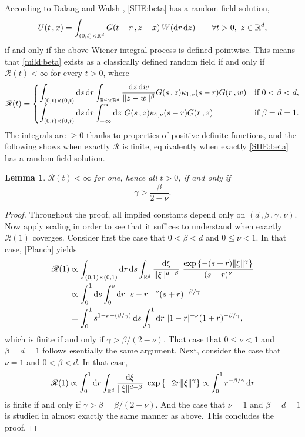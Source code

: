 \documentclass[reqno]{amsart}
\newcommand{\<}{\langle}
\renewcommand{\>}{\rangle}
\newcommand{\R}{\mathbb{R}}
\newcommand{\1}{\mathbb{1}}
\renewcommand{\d}{{\rm d}}
\renewcommand{\ge}{\geqslant}
\renewcommand{\le}{\leqslant}
\newtheorem{lemma}[stat]{Lemma}
\theoremstyle{definition}
\numberwithin{equation}{section}
\begin{document}
According to Dalang 
\cite{Dalang} and Walsh \cite{Walsh},
\eqref{SHE:beta} has a random-field solution,
\begin{equation}\label{mild:beta}
	U(t\,,x) = \int_{(0,t)\times\R^d} G(t-r\,,z-x)\,W(\d r\,\d z)
	\qquad\forall t>0,\ z\in\R^d,
\end{equation}
if and only if the above Wiener integral process is defined pointwise.
This means that \eqref{mild:beta} exists as a classically defined
random field if and only if $\mathscr{R}(t)<\infty$ for every $t>0$, where
\[
	\mathscr{R}(t) = \begin{cases}
		\displaystyle\int_{(0,t)\times(0,t)}\d s\,\d r\int_{\R^d\times\R^d} 
			\frac{\d z\,\d w}{\|z-w\|^\beta} G(s\,,z)\kappa_{1,\nu}(s-r)G(r\,,w)&\text{if $0<\beta<d$},\\
		\displaystyle
		\int_{(0,t)\times(0,t)}\d s\,\d r
			\int_{-\infty}^\infty\d z\ G(s\,,z)\kappa_{1,\nu}(s-r)G(r\,,z)&\text{if $\beta=d=1$}.
	\end{cases}
\]
The integrals are $\ge0$ thanks to properties of positive-definite functions,
and the following shows when exactly $\mathscr{R}$ is finite,
equivalently when exactly \eqref{SHE:beta} has a random-field
solution.

\begin{lemma}\label{lem:R(t)}
	$\mathscr{R}(t)<\infty$ for one, hence all $t>0$, if and only if
	\begin{equation}\label{cond:gamma}
		\gamma >  \frac{\beta}{2-\nu}.
	\end{equation}
\end{lemma}

\begin{proof}
	Throughout the proof, all implied constants depend only on
	$(d\,,\beta\,,\gamma\,,\nu)$. Now apply scaling in order to see
	that it suffices to understand when exactly $\mathscr{R}(1)$
	coverges.  Consider first the case that $0<\beta<d$ and $0\le\nu<1$. In that case,
	\eqref{Planch} yields
	\begin{align*}
		\mathscr{R}(1) &\propto\int_{(0,1)\times(0,1)}\d r\,\d s
			\int_{\R^d}\frac{\d\xi}{\| \xi \|^{d-\beta}}\ 
			\frac{\exp\left\{-(s+r)\|\xi\|^\gamma\right\}}{(s-r)^\nu}\\
		&\propto \int_0^1\d s\int_0^s \d r\ |s-r|^{-\nu} (s+r)^{-\beta/\gamma}\\
		&= \int_0^1s^{1-\nu - (\beta/\gamma)} \,\d s
			\int_0^1 \d r\ |1-r|^{-\nu} (1+r)^{-\beta/\gamma},
	\end{align*}
	which is finite if and only if  $\gamma > \beta/(2-\nu).$ That case that 
	$0\le\nu<1$ and $\beta=d=1$ follows esentially the same argument.
	Next, consider the case that $\nu=1$ and $0<\beta<d$. In that case,
	\[
		\mathscr{R}(1) \propto\int_0^1\d r
		\int_{\R^d}\frac{\d\xi}{\| \xi \|^{d-\beta}}\ 
		\exp\left\{-2r\|\xi\|^\gamma\right\} \propto \int_0^1 r^{-\beta/\gamma}\,\d r
	\]
	is finite if and only if $\gamma>\beta = \beta/(2-\nu)$. And the case that $\nu=1$ and $\beta=d=1$
	is studied in almost exactly the same manner as above. This concludes the proof.
\end{proof}
\end{document}
